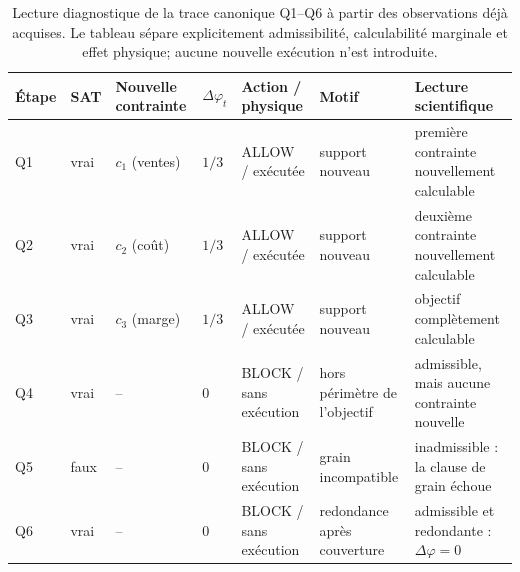\begin{table}[!t]
\centering
\caption{Lecture diagnostique de la trace canonique Q1--Q6 à partir des observations déjà acquises. Le tableau sépare explicitement admissibilité, calculabilité marginale et effet physique; aucune nouvelle exécution n'est introduite.}
\label{tab:q1-q6-diagnostic}
\scriptsize
\setlength{\tabcolsep}{2.4pt}
\renewcommand{\arraystretch}{1.10}
\begin{tabularx}{\textwidth}{@{}p{0.55cm}p{0.72cm}p{2.35cm}p{1.05cm}p{2.15cm}p{2.55cm}X@{}}
\toprule
Étape & SAT & Nouvelle contrainte & $\Delta\varphi_t$ & Action / physique & Motif & Lecture scientifique \\
\midrule
Q1 & vrai & $c_1$ (ventes) & $1/3$ & ALLOW / exécutée & support nouveau & première contrainte nouvellement calculable \\
Q2 & vrai & $c_2$ (coût) & $1/3$ & ALLOW / exécutée & support nouveau & deuxième contrainte nouvellement calculable \\
Q3 & vrai & $c_3$ (marge) & $1/3$ & ALLOW / exécutée & support nouveau & objectif complètement calculable \\
Q4 & vrai & -- & $0$ & BLOCK / sans exécution & hors périmètre de l'objectif & admissible, mais aucune contrainte nouvelle \\
Q5 & faux & -- & $0$ & BLOCK / sans exécution & grain incompatible & inadmissible : la clause de grain échoue \\
Q6 & vrai & -- & $0$ & BLOCK / sans exécution & redondance après couverture & admissible et redondante : $\Delta\varphi=0$ \\
\bottomrule
\end{tabularx}
\normalsize
\end{table}
